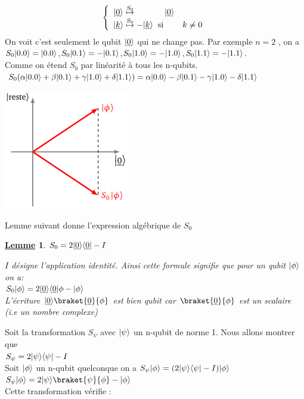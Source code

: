\documentclass[12pt,openany]{report}
\newtheorem{lemme}{\underline{Lemme}}
\DeclarePairedDelimiter\bra{\langle}{\rvert}
\DeclarePairedDelimiter\ket{\lvert}{\rangle}
\begin{document}
\[  
  \left\lbrace 
\begin{array}{ c @{\hspace{0.1cm}\overset{S_0}{\mapsto}\hspace{0.1cm}}  c }
\ket{\underline{0}}& \ket{\underline{0}}\\

\ket{\underline{k}}& -\ket{\underline{k}} \hspace{0.2cm} \text{si} \hspace{0.8cm} k\neq 0
\end{array}
\right.
\]
On voit c'est seulement le qubit $\ket{\underline{0}} $ qui ne change pas.
Par exemple $n=2 $ , on a $S_0 \ket{0.0}=\ket{0.0} $,$S_0 \ket{0.1}=-\ket{0.1} $,$S_0 \ket{1.0}=-\ket{1.0} $,$S_0 \ket{1.1}=-\ket{1.1} $.\\
Comme on étend $S_0 $ par linéarité à tous les n-qubits. \\
$ S_0(\alpha \ket{0.0}+ \beta \ket{0.1}+\gamma \ket{1.0}+\delta \ket{1.1})=
\alpha \ket{0.0}- \beta \ket{0.1}-\gamma \ket{1.0}-\delta \ket{1.1}  $
\begin{center}
\includegraphics[scale=1]{./sym}
\end{center}

Lemme suivant donne l'expression algébrique de $S_0 $
\begin{lemme}


$ S_0=2\ket{\underline{0}}\bra{\underline{0}}- I $

 $I $ désigne l'application identité. Ainsi cette formule signifie que pour un qubit $\ket{\phi} $ on a:\\
 $S_0 \ket{\phi}=2 \ket{\underline{0}} \bra{\underline{0}}{\phi}-\ket{\phi} $\\
 L'écriture $\ket{\underline{0}}\braket{\underline{0}}{\phi} $ est bien qubit car $\braket{\underline{0}}{\phi} $ est un scalaire (i.e un nombre complexe)

\end{lemme}
Soit la transformation $S_{\psi} $ avec 
$\ket{\psi}$ un n-qubit de norme 1.
Nous allons montrer que \\ 
$ S_{\psi}=2\ket{\psi}\bra{\psi}- I $\\
Soit $\ket{\phi} $ un n-qubit quelconque on a $S_{\psi}\ket{\phi}=(2\ket{\psi}\bra{\psi}- I)\ket{\phi } $\\
$ S_{\psi}\ket{\phi}=2\ket{\psi}\braket{\psi}{\phi}-\ket{\phi} $\\
Cette transformation vérifie :
\end{document}
